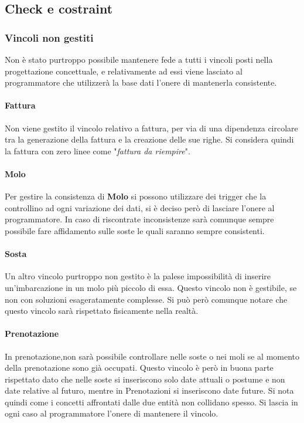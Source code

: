 \subsection{Check e costraint}

\subsubsection{Vincoli non gestiti}
Non è stato purtroppo possibile mantenere fede a tutti i vincoli posti nella progettazione concettuale, e relativamente ad essi viene lasciato al programmatore che utilizzerà la base dati l'onere di mantenerla consistente.

\paragraph{Fattura}
Non viene gestito il vincolo relativo a fattura, per via di una dipendenza circolare tra la generazione della fattura e la creazione delle sue righe. Si considera quindi la fattura con zero linee come "\textit{fattura da riempire}".

\paragraph{Molo}
Per gestire la consistenza di \textbf{Molo} si possono utilizzare dei trigger che la controllino ad ogni variazione dei dati, si è deciso però di lasciare l'onere al programmatore. In caso di riscontrate inconsistenze sarà comunque sempre possibile fare affidamento sulle soste le quali saranno sempre consistenti.

\paragraph{Sosta}
Un altro vincolo purtroppo non gestito è la palese impossibilità di inserire un'imbarcazione in un molo più piccolo di essa. Questo vincolo non è gestibile, se non con soluzioni esageratamente complesse. Si può però comunque notare che questo vincolo sarà rispettato fisicamente nella realtà.

\paragraph{Prenotazione} In prenotazione,non sarà possibile controllare nelle soste o nei moli se al momento della prenotazione sono già occupati. Questo vincolo è però in buona parte rispettato dato che nelle soste si inseriscono solo date attuali o postume e non date relative al futuro, mentre in Prenotazioni si inseriscono date future. Si nota quindi come i concetti affrontati dalle due entità non collidano spesso. Si lascia in ogni caso al programmatore l'onere di mantenere il vincolo.

